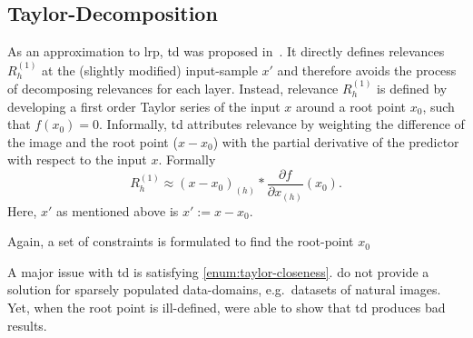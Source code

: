 \subsection{Taylor-Decomposition}
As an approximation to \gls{lrp}, \gls{td} was proposed in~\cite{Bach.2015}. It directly defines relevances \(R_{h}^{(1)}\) at the (slightly modified) input-sample \(x'\) and therefore avoids the process of decomposing relevances for each layer. Instead, relevance \(R_{h}^{(1)}\) is defined by developing a first order Taylor series of the input \(x\) around a root point \(x_0\), such that \(f(x_0) = 0\). Informally, \gls{td} attributes relevance by weighting the difference of the image and the root point (\(x-x_0\)) with the partial derivative of the predictor with respect to the input \(x\). Formally
\begin{equation}
    R_{h}^{(1)} \approx (x-x_0)_{(h)} * \frac{\partial f}{\partial x_{(h)}}(x_0).
\end{equation}
Here, \(x'\) as mentioned above is \(x':=x-x_0\).
\par
Again, a set of constraints is formulated to find the root-point \(x_0\)
A major issue with \gls{td} is satisfying \cref{enum:taylor-closeness}.  do not provide a solution for sparsely populated data-domains, e.g.\ datasets of natural images. Yet, when the root point is ill-defined,  were able to show that \gls{td} produces bad results.


